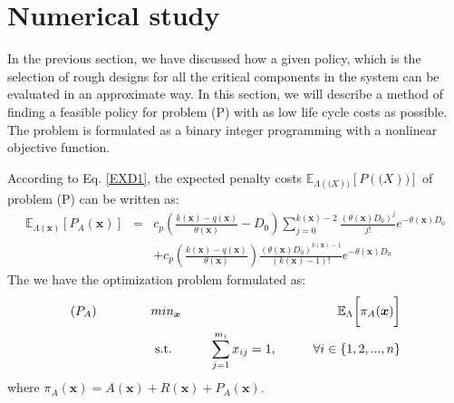 \documentclass[preprint,12pt]{elsarticle}
\begin{document}

\section{Numerical study}

In the previous section, we have discussed how a given policy, which is the selection of rough designs for all the critical components in the system can be evaluated in an approximate way. In this section, we will describe a method of finding a feasible policy for problem (P) with as low life cycle costs as possible. The problem is formulated as a binary integer programming with a nonlinear objective function.

According to Eq. \eqref{EXD1}, the expected penalty costs $\mathbb{E}_{\Lambda(\boldsymbol(X))}[P(\boldsymbol(X))]$ of problem (P) can be written as:
\begin{eqnarray}
\mathbb{E}_{\Lambda(\boldsymbol{x})}[P_{A}(\boldsymbol{x})]&=&c_{p}(\frac{k(\boldsymbol{x})-q(\boldsymbol{x})}{\theta(\boldsymbol{x})}-D_{0})\sum_{j=0}^{k(\boldsymbol{x})-2}{\frac{(\theta(\boldsymbol{x}) D_{0})^j}{j!}e^{-\theta(\boldsymbol{x}) D_{0}}}\nonumber\\
&&+c_{p}(\frac{k(\boldsymbol{x})-q(\boldsymbol{x})}{\theta(\boldsymbol{x})})\frac{(\theta(\boldsymbol{x})D_{0})^{k(\boldsymbol{x})-1}}{(k(\boldsymbol{x})-1)!}e^{-\theta(\boldsymbol{x})D_{0}}
\end{eqnarray}
The we have the optimization problem formulated as:
\begin{eqnarray}
\text{($P_{A}$)} \hspace{15mm} & min_{\boldsymbol{x}} & \hspace{10mm} \mathbb{E}_{\Lambda} \bigg[ \pi_{A}(\boldsymbol{x})\bigg] \nonumber\\
& \text{ s.t. }&  \hspace{5mm} \sum_{j=1}^{m_i}{x_{ij}}=1, \hspace{10mm} \forall i \in \{1,2,...,n\} \nonumber
\end{eqnarray}
where $\pi_{A}(\boldsymbol{x})=A(\boldsymbol{x})+R(\boldsymbol{x})+P_{A}(\boldsymbol{x})$.
\end{document}
